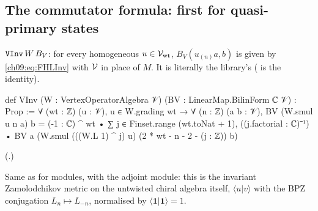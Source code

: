 \subsection{The commutator formula: first for quasi-primary states}

\begin{definition}\label{ch09:def:VInv}
$\lean{VInv}\,W\,B_V$: for every homogeneous $u\in\mathcal{V}_{\mathrm{wt}}$, $B_V(u_{(n)}a,b)$ is given by
\eqref{ch09:eq:FHLInv} with $\mathcal{V}$ in place of $M$. It is literally the library's
 ( is the identity).
\end{definition}
\begin{leancode}
def VInv (W : VertexOperatorAlgebra 𝒱) (BV : LinearMap.BilinForm ℂ 𝒱) : Prop :=
  ∀ (wt : ℤ) (u : 𝒱), u ∈ W.grading wt → ∀ (n : ℤ) (a b : 𝒱),
    BV (W.smul u n a) b
      = (-1 : ℂ) ^ wt • ∑ j ∈ Finset.range (wt.toNat + 1), ((j.factorial : ℂ)⁻¹) •
          BV a (W.smul (((W.L 1) ^ j) u) (2 * wt - n - 2 - (j : ℤ)) b)
\end{leancode}
(.)

\begin{physics}
Same as for modules, with the adjoint module: this is the invariant Zamolodchikov metric on the untwisted chiral algebra itself, $\langle u|v\rangle$ with the BPZ conjugation $L_n\mapsto L_{-n}$, normalised by $\langle\mathbf1|\mathbf1\rangle=1$.
\end{physics}

